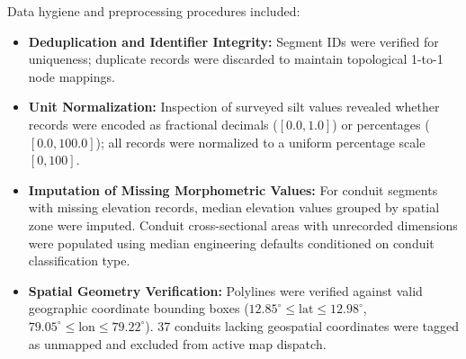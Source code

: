 \documentclass[12pt,a4paper]{report}
\begin{document}
Data hygiene and preprocessing procedures included:
\begin{itemize}
    \item \textbf{Deduplication and Identifier Integrity:} Segment IDs were verified for uniqueness; duplicate records were discarded to maintain topological 1-to-1 node mappings.
    \item \textbf{Unit Normalization:} Inspection of surveyed silt values revealed whether records were encoded as fractional decimals ($[0.0, 1.0]$) or percentages ($[0.0, 100.0]$); all records were normalized to a uniform percentage scale $[0, 100]$.
    \item \textbf{Imputation of Missing Morphometric Values:} For conduit segments with missing elevation records, median elevation values grouped by spatial zone were imputed. Conduit cross-sectional areas with unrecorded dimensions were populated using median engineering defaults conditioned on conduit classification type.
    \item \textbf{Spatial Geometry Verification:} Polylines were verified against valid geographic coordinate bounding boxes ($12.85^\circ \le \text{lat} \le 12.98^\circ$, $79.05^\circ \le \text{lon} \le 79.22^\circ$). 37 conduits lacking geospatial coordinates were tagged as unmapped and excluded from active map dispatch.
\end{itemize}
\end{document}
